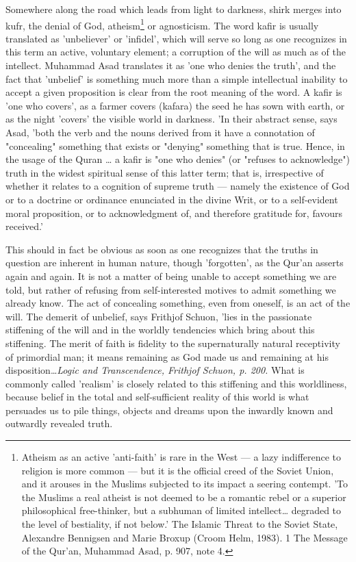\documentclass[11pt, b5paper, twoside]{book}
\begin{document}
Somewhere along the road which leads from light to darkness, shirk merges into kufr, the denial of 
God, atheism\footnote{Atheism as an active 'anti-faith' is rare in the West --- a lazy indifference to religion is more common --- but it is the official creed of the Soviet Union, and it arouses in the Muslims subjected to its impact a seering contempt. 'To the Muslims a real atheist is not deemed to be a romantic rebel or 
a superior philosophical free-thinker, but a subhuman of limited intellect\ldots{} degraded to the level 
of bestiality, if not below.' The Islamic Threat to the Soviet State, Alexandre Bennigsen and Marie 
Broxup (Croom Helm, 1983). 1 The Message of the Qur'an, Muhammad Asad, p. 907, note 4.} or agnosticism. The word kafir is usually translated as 'unbeliever' or 'infidel', which will serve so long as one recognizes in this term an active, voluntary element; a corruption of the will as much as of the intellect. Muhammad Asad translates it as 'one who denies the truth', and the fact that 'unbelief' is something much more than a simple intellectual inability to accept a given proposition is clear from the root meaning of the word. A kafir is 'one who covers', as a farmer covers (kafara) the seed he has sown with earth, or as the night 'covers' the visible world in darkness. 'In their abstract sense, says Asad, 'both the verb and the nouns derived from it have a connotation of "concealing" something that exists or "denying" something that is true. Hence, in the usage of the Quran \ldots{} a kafir is "one who denies" (or "refuses to acknowledge") truth in the widest spiritual sense of this latter term; that is, irrespective of whether it relates to a cognition of supreme truth --- namely the existence of God or to a doctrine or ordinance enunciated in the divine Writ, or to a self-evident moral proposition, or to acknowledgment of, and therefore gratitude for, favours received.'

This should in fact be obvious as soon as one recognizes that the truths in question are inherent in 
human nature, though 'forgotten', as the Qur'an asserts again and again. It is not a matter of being 
unable to accept something we are told, but rather of refusing from self-interested motives to admit 
something we already know. The act of concealing something, even from oneself, is an act of the will. 
The demerit of unbelief, says Frithjof Schuon, 'lies in the passionate stiffening of the will and in 
the worldly tendencies which bring about this stiffening. The merit of faith is fidelity to the 
supernaturally natural receptivity of primordial man; it means remaining as God made us and remaining 
at his disposition\ldots{}\emph{Logic and Transcendence, Frithjof Schuon, p. 200.} What is commonly called 'realism' is closely related to this stiffening and this worldliness, because belief in the total and self-sufficient reality of this world is what persuades us to pile things, objects and dreams upon the inwardly known and outwardly revealed truth. \\
\end{document}
